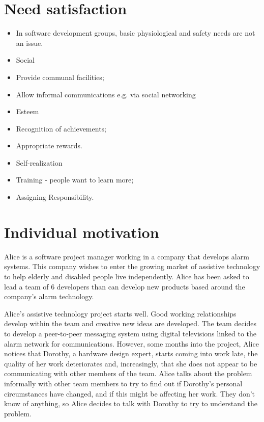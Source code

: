 \section{ Need satisfaction}
\begin{itemize}

\item In software development groups, basic physiological and safety needs are not an issue.

\item Social

  \item Provide communal facilities;
  \item Allow informal communications e.g. via social networking \item Esteem
  \item Recognition of achievements;   \item Appropriate rewards.
\item Self-realization

  \item Training - people want to learn more;   \item Assigning Responsibility.


\end{itemize}
\section{ Individual motivation}


Alice is a software project manager working in a company that develops alarm systems. This company wishes to enter the growing market of assistive technology to help elderly and disabled people live independently. Alice has been asked to lead a team of 6 developers than can develop new products based around the company’s alarm technology.


Alice’s assistive technology project starts well. Good working relationships develop within the team and creative new ideas are developed. The team decides to develop a peer-to-peer messaging system using digital televisions linked to the alarm network for communications. However, some months into the project, Alice notices that Dorothy, a hardware design expert, starts coming into work late, the quality of her work deteriorates and, increasingly, that she does not appear to be communicating with other members of the team.
Alice talks about the problem informally with other team members to try to find out if Dorothy’s personal circumstances have changed, and if this might be affecting her work. They don’t know of anything, so Alice decides to talk with Dorothy to try to understand the problem.

